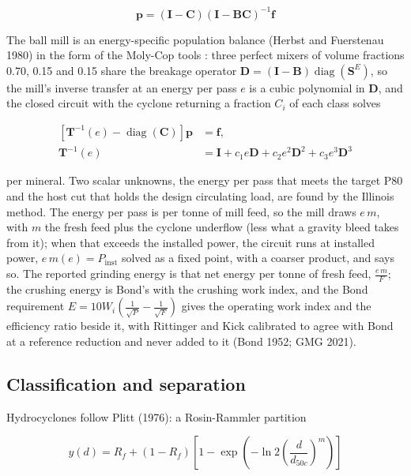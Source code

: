 \documentclass[10pt]{article}
\begin{document}
\[
\mathbf{p}=(\mathbf{I}-\mathbf{C})(\mathbf{I}-\mathbf{B}\mathbf{C})^{-1}\mathbf{f}
\]

The ball mill is an energy-specific population balance (Herbst and
Fuerstenau 1980) in the form of the Moly-Cop tools \cite{molycoptools}:
three perfect mixers of volume fractions 0.70, 0.15 and 0.15 share the
breakage operator
\(\mathbf{D}=(\mathbf{I}-\mathbf{B})\operatorname{diag}(\boldsymbol{S}^{E})\),
so the mill's inverse transfer at an energy per pass \(e\) is a cubic
polynomial in \(\mathbf{D}\), and the closed circuit with the cyclone
returning a fraction \(C_i\) of each class solves

\[
\begin{aligned}
\left[\mathbf{T}^{-1}(e)-\operatorname{diag}(\boldsymbol{C})\right]\mathbf{p}
  &=\mathbf{f},\\
\mathbf{T}^{-1}(e)
  &=\mathbf{I}+c_1e\mathbf{D}+c_2e^2\mathbf{D}^2+c_3e^3\mathbf{D}^3
\end{aligned}
\]

per mineral. Two scalar unknowns, the energy per pass that meets the
target P80 and the host cut that holds the design circulating load, are
found by the Illinois method. The energy per pass is per tonne of mill
feed, so the mill draws \(e\,m\), with \(m\) the fresh feed plus the
cyclone underflow (less what a gravity bleed takes from it); when that
exceeds the installed power, the circuit runs at installed power,
\(e\,m(e)=P_{\mathrm{inst}}\) solved as a fixed point, with a coarser
product, and says so. The reported grinding energy is that net energy
per tonne of fresh feed, \(\frac{e\,m}{F}\); the crushing energy is
Bond's with the crushing work index, and the Bond requirement
\(E=10W_i\left(\frac{1}{\sqrt{P}}-\frac{1}{\sqrt{F}}\right)\) gives the
operating work index and the efficiency ratio beside it, with Rittinger
and Kick calibrated to agree with Bond at a reference reduction and
never added to it (Bond 1952; GMG 2021).

\subsection{Classification and
separation}\label{classification-and-separation}

Hydrocyclones follow Plitt (1976): a Rosin-Rammler partition

\[
y(d)=R_f+(1-R_f)\left[1-\exp\!\left(-\ln 2\left(\frac{d}{d_{50c}}\right)^m\right)\right]
\]
\end{document}
